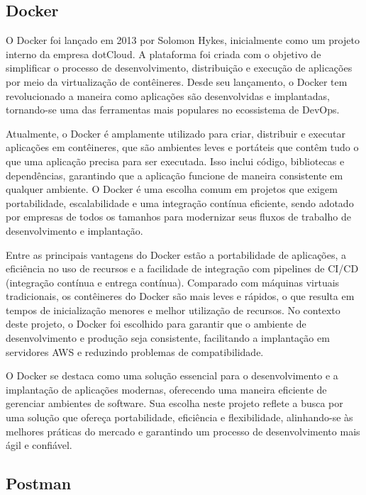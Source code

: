 \subsection{Docker}

O Docker foi lançado em 2013 por Solomon Hykes, inicialmente como um projeto interno da empresa dotCloud. A plataforma foi criada com o objetivo de simplificar o processo de desenvolvimento, distribuição e execução de aplicações por meio da virtualização de contêineres. Desde seu lançamento, o Docker tem revolucionado a maneira como aplicações são desenvolvidas e implantadas, tornando-se uma das ferramentas mais populares no ecossistema de DevOps.

Atualmente, o Docker é amplamente utilizado para criar, distribuir e executar aplicações em contêineres, que são ambientes leves e portáteis que contêm tudo o que uma aplicação precisa para ser executada. Isso inclui código, bibliotecas e dependências, garantindo que a aplicação funcione de maneira consistente em qualquer ambiente. O Docker é uma escolha comum em projetos que exigem portabilidade, escalabilidade e uma integração contínua eficiente, sendo adotado por empresas de todos os tamanhos para modernizar seus fluxos de trabalho de desenvolvimento e implantação.

Entre as principais vantagens do Docker estão a portabilidade de aplicações, a eficiência no uso de recursos e a facilidade de integração com pipelines de CI/CD (integração contínua e entrega contínua). Comparado com máquinas virtuais tradicionais, os contêineres do Docker são mais leves e rápidos, o que resulta em tempos de inicialização menores e melhor utilização de recursos. No contexto deste projeto, o Docker foi escolhido para garantir que o ambiente de desenvolvimento e produção seja consistente, facilitando a implantação em servidores AWS e reduzindo problemas de compatibilidade.

O Docker se destaca como uma solução essencial para o desenvolvimento e a implantação de aplicações modernas, oferecendo uma maneira eficiente de gerenciar ambientes de software. Sua escolha neste projeto reflete a busca por uma solução que ofereça portabilidade, eficiência e flexibilidade, alinhando-se às melhores práticas do mercado e garantindo um processo de desenvolvimento mais ágil e confiável.

\subsection{Postman}

